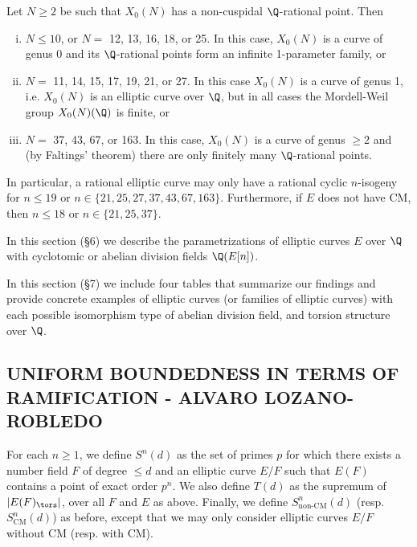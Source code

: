 \begin{thm} %
Let $N \geq 2$ be such that $X_0(N)$ has a non-cuspidal $\Q$-rational point. Then
	\begin{enumerate}[(i)]
	\item $N \leq 10$, or $N=$ 12, 13, 16, 18, or 25. In this case, $X_0(N)$ is a curve of genus 0 and its $\Q$-rational points form an infinite 1-parameter family, or
	\item $N=$ 11, 14, 15, 17, 19, 21, or 27. In this case $X_0(N)$ is a curve of genus 1, i.e. $X_0(N)$ is an elliptic curve over $\Q$, but in all cases the Mordell-Weil group $X_0(N)(\Q)$ is finite, or
	\item $N=$ 37, 43, 67, or 163. In this case, $X_0(N)$ is a curve of genus $\geq 2$ and (by Faltings' theorem) there are only finitely many $\Q$-rational points. 
	\end{enumerate}
In particular, a rational elliptic curve may only have a rational cyclic $n$-isogeny for $n \leq 19$ or $n \in \{21,25,27,37,43,67,163\}$. Furthermore, if $E$ does not have CM, then $n \leq 18$ or $n \in \{21,25,37\}$.
\end{thm}


In this section (\S6) we describe the parametrizations of elliptic curves $E$ over $\Q$ with cyclotomic or abelian division fields $\Q(E[n])$.


In this section (\S7) we include four tables that summarize our findings and provide concrete examples of elliptic curves (or families of elliptic curves) with each possible isomorphism type of abelian division field, and torsion structure over $\Q$.



\subsection{UNIFORM BOUNDEDNESS IN TERMS OF RAMIFICATION - ALVARO LOZANO-ROBLEDO }


\begin{dfn} %
For each $n \geq 1$, we define $S^n(d)$ as the set of primes $p$ for which there exists a number field $F$ of degree $\leq d$ and an elliptic curve $E/F$ such that $E(F)$ contains a point of exact order $p^n$. We also define $T(d)$ as the supremum of $|E(F)_\tors|$, over all $F$ and $E$ as above. Finally, we define $S^n_{\text{non-CM}}(d)$ (resp. $S^n_{\text{CM}}(d)$) as before, except that we may only consider elliptic curves $E/F$ without CM (resp. with CM). 
\end{dfn}


